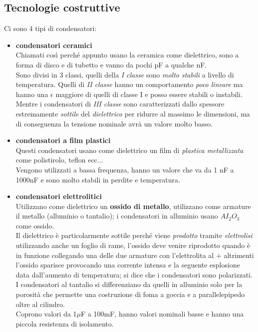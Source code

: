 \documentclass{article}
\begin{document}
\subsection{Tecnologie costruttive}
Ci sono 4 tipi di condensatori:
\begin{itemize}
    \item \textbf{condensatori ceramici}\\
    Chiamati così perché appunto usano la  ceramica come dielettrico, sono a forma di disco e di tubetto e vanno da pochi pF a qualche nF.\\
    Sono divisi in 3 classi, quelli della \textit{I classe} sono \textit{molto stabili} a livello di temperatura. 
    Quelli di \textit{II classe} hanno un comportamento \textit{poco lineare} ma hanno una $\epsilon$ maggiore di quelli di classe I e posso essere stabili o instabili.\\
    Mentre i condensatori di \textit{III classe} sono caratterizzati dallo spessore estremamente \textit{sottile} del \textit{dielettrico} per ridurre al massimo le dimensioni, ma di conseguenza la tensione nominale avrà un valore molto basso.
    
    \item \textbf{condensatori a film plastici}\\
   Questi condensatori usano come dielettrico un film di \textit{plastica metallizzata} come polistirolo, teflon ecc...\\
   Vengono utilizzati a bassa frequenza, hanno un valore che va da 1 nF a  1000nF e sono molto stabili in perdite e temperatura.
    
    \item \textbf{condensatori elettrolitici}\\
    Utilizzano come dielettrico un \textbf{ossido di metallo}, utilizzano come armature il metallo (alluminio o tantalio); i condensatori in alluminio usano $AI_2O_3$ come ossido.\\
    Il dielettrico è particolarmente sottile perché viene \textit{prodotto} tramite \textit{elettrolisi} utilizzando anche un foglio di rame, l'ossido deve venire riprodotto quando è in funzione collegando una delle due armature con l'elettrolita al + altrimenti l'ossido sparisce provocando una corrente intensa e la seguente esplosione data dall'aumento di temperatura; si dice che i condensatori sono polarizzati.\\
    I condensatori al tantalio si differenziano da quelli in alluminio solo per la porosità che permette una costruzione di foma a goccia e a parallelepipedo oltre al cilindro.\\ 
    Coprono valori da 1$\mu$F a 100mF, hanno valori nominali basse e hanno una piccola resistenza di isolamento.
    

\end{itemize}
\end{document}
